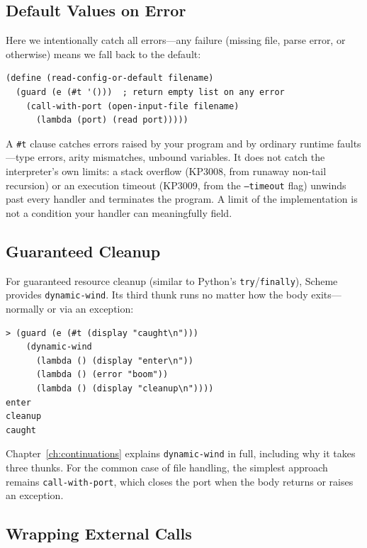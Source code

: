 \subsection{Default Values on Error}

Here we intentionally catch all errors---any failure (missing file, parse error, or otherwise) means we fall back to the default:

\begin{lstlisting}
(define (read-config-or-default filename)
  (guard (e (#t '()))  ; return empty list on any error
    (call-with-port (open-input-file filename)
      (lambda (port) (read port)))))
\end{lstlisting}

\begin{warning}
A \texttt{\#t} clause catches errors raised by your program and by ordinary runtime faults---type errors, arity mismatches, unbound variables. It does not catch the interpreter's own limits: a stack overflow (KP3008, from runaway non-tail recursion) or an execution timeout (KP3009, from the \texttt{--timeout} flag) unwinds past every handler and terminates the program. A limit of the implementation is not a condition your handler can meaningfully field.
\end{warning}

\subsection{Guaranteed Cleanup}

For guaranteed resource cleanup (similar to Python's \texttt{try}/\texttt{finally}), Scheme provides \texttt{dynamic-wind}. Its third thunk runs no matter how the body exits---normally or via an exception:

\begin{lstlisting}[style=repl]
> (guard (e (#t (display "caught\n")))
    (dynamic-wind
      (lambda () (display "enter\n"))
      (lambda () (error "boom"))
      (lambda () (display "cleanup\n"))))
enter
cleanup
caught
\end{lstlisting}

Chapter~\ref{ch:continuations} explains \texttt{dynamic-wind} in full, including why it takes three thunks. For the common case of file handling, the simplest approach remains \texttt{call-with-port}, which closes the port when the body returns or raises an exception.

\subsection{Wrapping External Calls}

